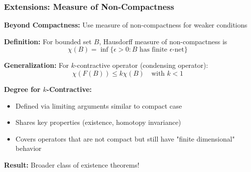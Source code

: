 \documentclass[aspectratio=169,10pt]{beamer}
\begin{document}
\begin{frame}
\frametitle{Extensions: Measure of Non-Compactness}

\textbf{Beyond Compactness:} Use measure of non-compactness for weaker conditions

\vspace{0.3cm}
\textbf{Definition:} For bounded set $B$, Hausdorff measure of non-compactness is
$$\chi(B) = \inf\{\epsilon > 0 : B \text{ has finite } \epsilon\text{-net}\}$$

\vspace{0.3cm}
\textbf{Generalization:} For $k$-contractive operator (condensing operator):
$$\chi(F(B)) \leq k \chi(B) \quad \text{with } k < 1$$

\vspace{0.3cm}
\textbf{Degree for $k$-Contractive:}
\begin{itemize}
    \item Defined via limiting arguments similar to compact case
    \item Shares key properties (existence, homotopy invariance)
    \item Covers operators that are not compact but still have "finite dimensional" behavior
\end{itemize}

\vspace{0.3cm}
\textbf{Result:} Broader class of existence theorems!
\end{frame}
\end{document}
